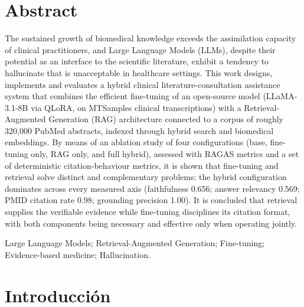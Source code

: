 \documentclass[11pt,a4paper,spanish]{book}
\numberwithin{equation}{chapter}
\numberwithin{figure}{chapter}
\begin{document}
\chapter{Abstract}
The sustained growth of biomedical knowledge exceeds the assimilation capacity of clinical practitioners, and Large Language Models (LLMs), despite their potential as an interface to the scientific literature, exhibit a tendency to hallucinate that is unacceptable in healthcare settings. This work designs, implements and evaluates a hybrid clinical literature-consultation assistance system that combines the efficient fine-tuning of an open-source model (LLaMA-3.1-8B via QLoRA, on MTSamples clinical transcriptions) with a Retrieval-Augmented Generation (RAG) architecture connected to a corpus of roughly 320,000 PubMed abstracts, indexed through hybrid search and biomedical embeddings. By means of an ablation study of four configurations (base, fine-tuning only, RAG only, and full hybrid), assessed with RAGAS metrics and a set of deterministic citation-behaviour metrics, it is shown that fine-tuning and retrieval solve distinct and complementary problems: the hybrid configuration dominates across every measured axis (faithfulness 0.656; answer relevancy 0.569; PMID citation rate 0.98; grounding precision 1.00). It is concluded that retrieval supplies the verifiable evidence while fine-tuning disciplines its citation format, with both components being necessary and effective only when operating jointly.

\vspace{1em}
 Large Language Models; Retrieval-Augmented Generation; Fine-tuning; Evidence-based medicine; Hallucination.




\mainmatter
\chapter{Introducción}

%
%
\end{document}
